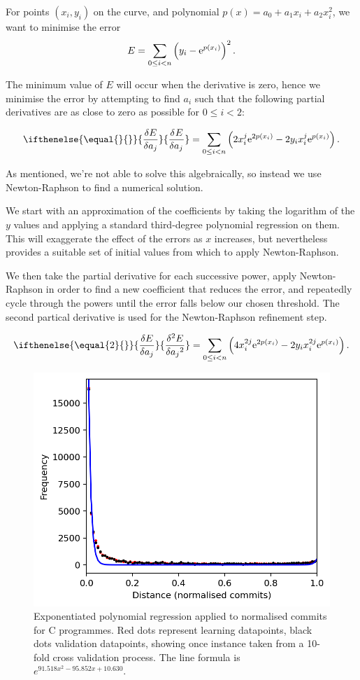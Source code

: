 \documentclass[pdflatex, sn-mathphys, referee]{sn-jnl}%
\theoremstyle{thmstyleone}%
\theoremstyle{thmstyletwo}%
\theoremstyle{thmstylethree}%
\newcommand{\esup}[1]{{\rm e}^{#1}}
\newcommand{\partdiff}[3][]{%
\ifthenelse{\equal{#1}{}}{%
\frac{{\rm \delta} #2}{{\rm \delta} {#3}}
}{%
\frac{{\rm \delta}^{#1} #2}{{\rm \delta} {#3}^{#1}}
}%
}
\theoremstyle{thmstyleone}
\begin{document}
For points $(x_i, y_i)$ on the curve, and polynomial $p(x) = a_0 + a_1 x_i + a_2 x_i^2$, we want to minimise the error
$$
E = \sum_{0 \le i < n} \left( y_i - \esup{p(x_i)} \right)^2 .
$$

The minimum value of $E$ will occur when the derivative is zero, hence we minimise the error by attempting to find $a_i$ such that the following partial derivatives are as close to zero as possible for $0 \le i < 2$:

$$
\partdiff{E}{a_j} = \sum_{0 \le i < n} \left( 2 x_i^j \esup{2 p(x_i)} - 2 y_i x_i^j \esup{p(x_i)} \right) .
$$

As mentioned, we're not able to solve this algebraically, so instead we use Newton-Raphson to find a numerical solution.

We start with an approximation of the coefficients by taking the logarithm of the $y$ values and applying a standard third-degree polynomial regression on them. This will exaggerate the effect of the errors as $x$ increases, but nevertheless provides a suitable set of initial values from which to apply Newton-Raphson.

We then take the partial derivative for each successive power, apply Newton-Raphson in order to find a new coefficient that reduces the error, and repeatedly cycle through the powers until the error falls below our chosen threshold. The second partical derivative is used for the Newton-Raphson refinement step.

$$
\partdiff[2]{E}{a_j} = \sum_{0 \le i < n} \left( 4 x_i^{2j} \esup{2 p(x_i)} - 2 y_i x_i^{2j} \esup{p(x_i)} \right) .
$$

\begin{figure}[t]
\centering
\includegraphics[width=0.7\columnwidth]{Fig6}%
\caption{\label{fig:c-exp}Exponentiated polynomial regression applied to normalised commits for C programmes. Red dots represent learning datapoints, black dots validation datapoints, showing once instance taken from a 10-fold cross validation process. The line formula is $e^{91.518 x^{2} - 95.852 x + 10.630}$.}
\end{figure}
\end{document}
